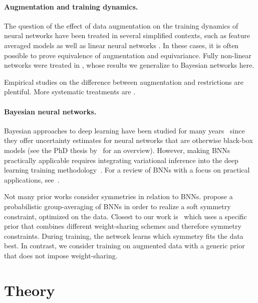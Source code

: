 \documentclass{article}
\begin{document}
\paragraph{Augmentation and training dynamics.}
The question of the effect of data augmentation on the training dynamics of neural networks have been treated in several simplified contexts, such as feature averaged models \citep{lyle2020benefits,elesedy2021provably} as well as linear neural networks \citep{lawrence2022implicit,chen2024implicit,montufar2025equivariant}. In these cases, it is often possible to prove equivalence of augmentation and equivariance. Fully non-linear networks were treated in \citet{nordenfors2025optimization,nordenfors2025}, whose results we generalize to Bayesian networks here.

Empirical studies on the difference between augmentation and restrictions are plentiful. More systematic treatments are \citet{gandikotaTrainingArchitectureHow2021,gerken22a,brehmer2025}.

\paragraph{Bayesian neural networks.}
Bayesian approaches to deep learning have been studied for many years~\citep{mackay1992} since they offer uncertainty estimates for neural networks that are otherwise black-box models (see the PhD thesis by~\citet{Gal2016Uncertainty} for an overview).
However, making BNNs practically applicable requires integrating variational inference into the deep learning training methodology~\citep{gravesPracticalVariationalInference2011,blundell2015,kingma2022}.
For a review of BNNs with a focus on practical applications, see~\citet{jospin2022}.

Not many prior works consider symmetries in relation to BNNs.
\citet{pmlr-v180-ouderaa22a} propose a probabilistic group-averaging of BNNs in order to realize a soft symmetry constraint, optimized on the data. Closest to our work is~\citet{mourdoukoutas2021} which uses a specific prior that combines different weight-sharing schemes and therefore symmetry constraints. During training, the network learns which symmetry fits the data best. In contrast, we consider training on augmented data with a generic prior that does not impose weight-sharing.


\section{Theory}
\label{sec:theory}
\end{document}
